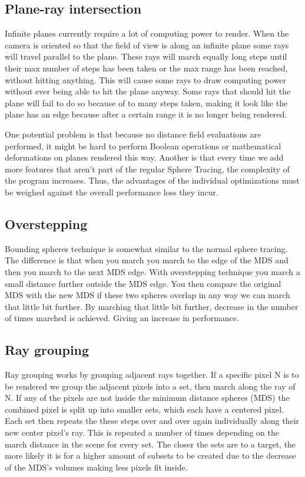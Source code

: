 		\subsection{Plane-ray intersection}

			Infinite planes currently require a lot of computing power to
			render. When the camera is oriented so that the field of view is
			along an infinite plane some rays will travel parallel to the
			plane. These rays will march equally long steps until their max
			number of steps has been taken or the max range has been reached, without hitting anything. This will cause some rays to draw computing power without ever being able to hit the plane anyway. Some rays that should hit the plane will fail to do so because of to many steps taken, making it look like the plane has an edge because after a certain range it is no longer being rendered.


			One potential problem is that because no distance field evaluations 
			are performed, it might be hard to perform Boolean operations or 
			mathematical deformations on planes rendered this way. Another is 
			that every time we add more features that aren't part of the regular 
			Sphere Tracing, the complexity of the program increases. Thus, the 
			advantages of the individual optimizations must be weighed against 
			the overall performance loss they incur. 

		\subsection{Overstepping}

			Bounding spheres technique is somewhat similar to the normal sphere
			tracing. The difference is that when you march you march to the
			edge of the MDS and then you march to the next MDS edge. With
			overstepping technique you march a small distance further
			outside the MDS edge. You then compare the original MDS with the
			new MDS if these two spheres overlap in any way we can march that
			little bit further. By marching that little bit further, decrease
			in the number of times marched is achieved. Giving an increase in
			performance. 

			
		\subsection{Ray grouping}
		
			Ray grouping works by grouping adjacent rays together.  If a specific
			pixel N is to be rendered we group the adjacent pixels into a set, then
			march along the ray of N. If any of the pixels are not inside the minimum
			distance spheres (MDS) the combined pixel is split up into smaller sets,
			which each have a centered pixel. Each set then repeats the these steps
			over and over again individually along their new center pixel's ray.
			This is repeated a number of times depending on the march distance in the
			scene for every set. The closer the sets are to a target, the more likely
			it is for a higher amount of subsets to be created due to the decrease of
			the MDS's volumes making less pixels fit inside.
			
